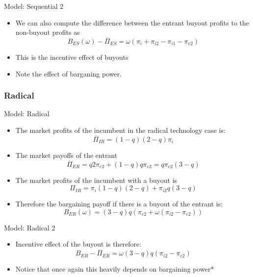 \documentclass{beamer}
\begin{document}
\begin{frame}{Model: Sequential 2}
\begin{itemize}
    \item We can also compute the difference between the entrant buyout profits to the non-buyout profits as
    \begin{equation*}
        B_{ES}(\omega) - \overline{\Pi}_{ES} = 
\omega (\pi_{i} +  \pi_{i2} - \pi_{i1}-\pi_{e2} )
    \end{equation*}
    \item This is the incentive effect of buyouts
    \item Note the effect of barganing power. 
\end{itemize}
\end{frame}

\subsubsection{Radical}

\begin{frame}{Model: Radical}
\begin{itemize}
    \item The market profits of the incumbent in the radical  technology case is:
    \begin{equation*}
       \overline{\Pi}_{IR} = (1-q)(2-q) \pi_{i}
    \end{equation*}
    \item The market payoffs of the entrant 
    \begin{equation*}
\overline{\Pi}_{ER} =
q 2 \pi_{e2}+(1-q)q\pi_{e2}=q\pi_{e2}(3-q)
    \end{equation*}
    \item The market profits of the incumbent with a buyout is
    \begin{equation*}
       \Pi_{IR} = \pi_{i} (1-q) (2-q)+\pi_{i2} q (3-q)
    \end{equation*}
    \item Therefore the bargaining payoff if there is a buyout of the entrant is: 
    \begin{equation*}
       B_{ER}(\omega)=  (3-q)q(\pi_{e2}+\omega  (\pi_{i2} - \pi_{e2}))
    \end{equation*}
\end{itemize}
\end{frame}

\begin{frame}{Model: Radical 2}
\begin{itemize}
    \item Incentive effect of the buyout is therefore:
    \begin{equation*}
B_{ER}-\overline{\Pi}_{ER} 
=\omega (3-q)q 
\left(
\pi_{i2} 
-\pi_{e2}
\right) 
    \end{equation*}
\item Notice that once again this heavily depends on bargaining power*
\end{itemize}
\end{frame}
\end{document}
